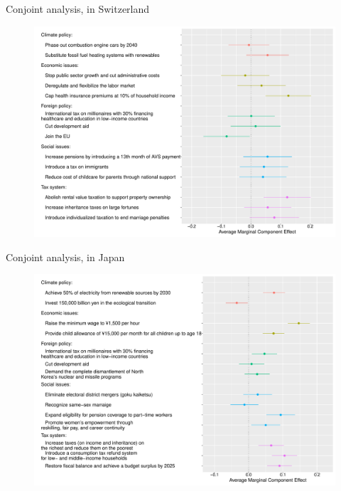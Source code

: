 \documentclass[aspectratio=169,xcolor=dvipsnames, 11pt,mathserif]{beamer}
\begin{document}
\begin{frame}{Conjoint analysis,  in Switzerland\label{conjoint_countries} \hyperlink{conjoint_country}{}} 
    \begin{figure} \vspace{-.14cm}
\includegraphics[height=.97\textheight]{../figures/all/conjoint_EN-CH.pdf}
\end{figure}
\end{frame}

\begin{frame}{Conjoint analysis,  in Japan\label{conjoint_countries} \hyperlink{conjoint_country}{}} 
    \begin{figure} \vspace{-.14cm}
\includegraphics[height=.97\textheight]{../figures/all/conjoint_EN-JA.pdf}
\end{figure}
\end{frame}
\end{document}
